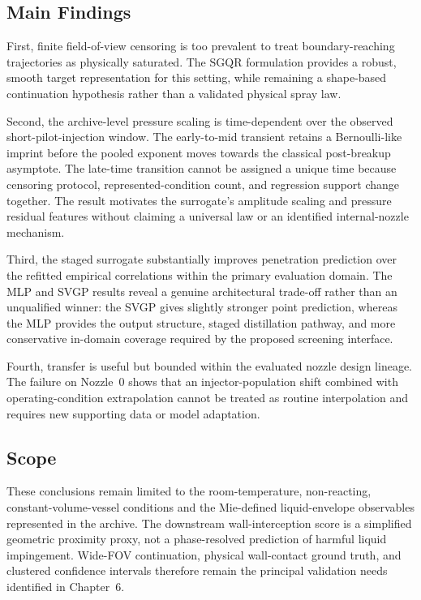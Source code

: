 \subsection{Main Findings}

First, finite field-of-view censoring is too prevalent to treat boundary-reaching trajectories as physically saturated. The \(\mathrm{SGQR}\) formulation provides a robust, smooth target representation for this setting, while remaining a shape-based continuation hypothesis rather than a validated physical spray law.

Second, the archive-level pressure scaling is time-dependent over the observed short-pilot-injection window. The early-to-mid transient retains a Bernoulli-like imprint before the pooled exponent moves towards the classical post-breakup asymptote. The late-time transition cannot be assigned a unique time because censoring protocol, represented-condition count, and regression support change together. The result motivates the surrogate's amplitude scaling and pressure residual features without claiming a universal law or an identified internal-nozzle mechanism.

Third, the staged surrogate substantially improves penetration prediction over the refitted empirical correlations within the primary evaluation domain. The MLP and SVGP results reveal a genuine architectural trade-off rather than an unqualified winner: the SVGP gives slightly stronger point prediction, whereas the MLP provides the output structure, staged distillation pathway, and more conservative in-domain coverage required by the proposed screening interface.

Fourth, transfer is useful but bounded within the evaluated nozzle design lineage. The failure on Nozzle~0 shows that an injector-population shift combined with operating-condition extrapolation cannot be treated as routine interpolation and requires new supporting data or model adaptation.

\subsection{Scope}

These conclusions remain limited to the room-temperature, non-reacting, constant-volume-vessel conditions and the Mie-defined liquid-envelope observables represented in the archive. The downstream wall-interception score is a simplified geometric proximity proxy, not a phase-resolved prediction of harmful liquid impingement. Wide-FOV continuation, physical wall-contact ground truth, and clustered confidence intervals therefore remain the principal validation needs identified in Chapter~6.

